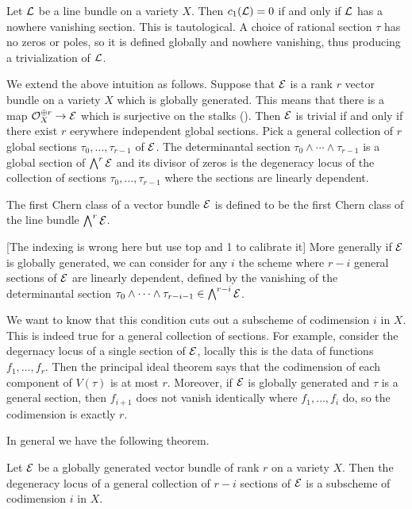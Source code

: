 \documentclass[12pt]{article}
\begin{document}
\begin{example}
    Let ${\mathcal{L}}$ be a line bundle on a variety $X$. Then $c_1({\mathcal{L}}) = 0$ if and only if ${\mathcal{L}}$ has a nowhere vanishing section.
    This is tautological. A choice of rational section $\tau$ has no zeros or poles, so it is defined 
    globally and nowhere vanishing, thus producing a trivialization of ${\mathcal{L}}$.
\end{example}
We extend the above intuition as follows. Suppose that ${\mathcal{E}}$ is a rank $r$ vector bundle on a variety $X$ which is globally generated. This means that 
there is a map ${\mathcal{O}}_X^{\oplus r} \to {\mathcal{E}}$ which is surjective on the stalks (). Then ${\mathcal{E}}$ is trivial if and only if there exist
$r$ eerywhere independent global sections. Pick a general collection of $r$ global sections $\tau_0,\dots, \tau_{r-1}$
of ${\mathcal{E}}$. The determinantal section $\tau_0\wedge \cdots \wedge \tau_{r-1}$ is a global section of $\bigwedge^r {\mathcal{E}}$
and its divisor of zeros is the degeneracy locus of the collection of sections $\tau_0,\dots, \tau_{r-1}$ where
the sections are linearly dependent. 

\begin{definition}
    The first Chern class of a vector bundle ${\mathcal{E}}$ is defined to be the first Chern class of the line bundle
    $\bigwedge^r {\mathcal{E}}$.
\end{definition}

[The indexing is wrong here but use top and 1 to calibrate it] More generally if ${\mathcal{E}}$ is globally generated, we can consider for any $i$ the scheme where
$r-i$ general sections of ${\mathcal{E}}$ are linearly dependent, defined by the vanishing of 
the determinantal section $\tau_0\wedge \cdots \wedge \tau_{r-i-1} \in \bigwedge^{r-i} {\mathcal{E}}$.

\hfill 

We want to know that this condition cuts out a subscheme of codimension $i$ in $X$. This is indeed true for 
a general collection of sections. For example, consider the degernacy locus of a single section of ${\mathcal{E}}$, locally 
this is the data of functions $f_1,\dots,f_r$. Then the principal ideal theorem says that the codimension of each component
of $V(\tau)$ is at most $r$. Moreover, if ${\mathcal{E}}$ is globally generated and $\tau$ is a general section,
then $f_{i+1}$ does not vanish identically where $f_1,\dots,f_i$ do, so the codimension is exactly $r$.

\hfill

In general we have the following theorem.
\begin{theorem}
    Let ${\mathcal{E}}$ be a globally generated vector bundle of rank $r$ on a variety $X$. Then the degeneracy locus of a general
    collection of $r-i$ sections of ${\mathcal{E}}$ is a subscheme of codimension $i$ in $X$.
\end{theorem}
\end{document}
